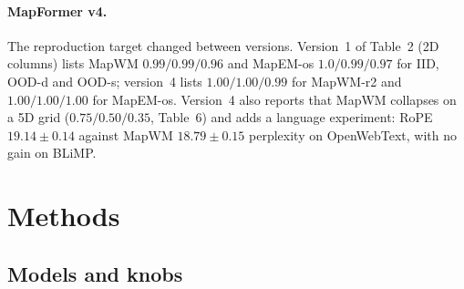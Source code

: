 \documentclass[10pt]{article}
\begin{document}
\paragraph{MapFormer v4.} The reproduction target changed between versions. Version~1 of Table~2
(2D columns) lists MapWM $0.99/0.99/0.96$ and MapEM-os $1.0/0.99/0.97$ for IID, OOD-d and OOD-s;
version~4 lists $1.00/1.00/0.99$ for MapWM-r2 and $1.00/1.00/1.00$ for MapEM-os. Version~4 also
reports that MapWM collapses on a 5D grid ($0.75/0.50/0.35$, Table~6) and adds a language experiment:
RoPE $19.14\pm0.14$ against MapWM $18.79\pm0.15$ perplexity on OpenWebText, with no gain on BLiMP.

\section{Methods}
\label{sec:methods}

\subsection{Models and knobs}
\label{sec:models}
\end{document}
